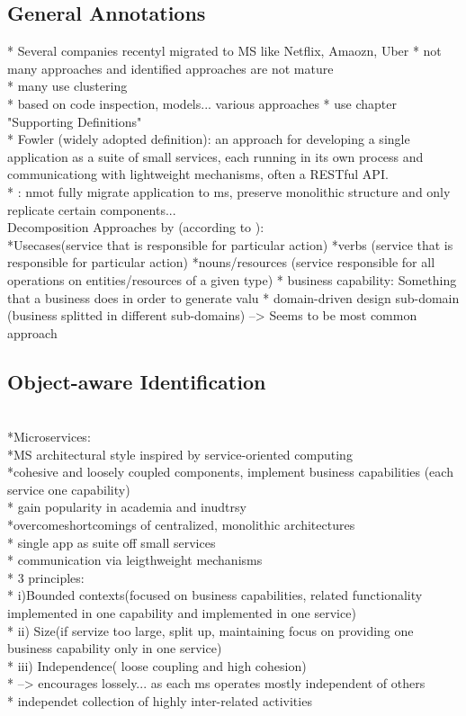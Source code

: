 \subsection{General Annotations}
* Several companies recentyl migrated to MS like Netflix, Amaozn, Uber
* not many approaches and identified approaches are not mature\\
* many use clustering \\
* based on code inspection, models... various approaches
* use chapter "Supporting Definitions"\\
* Fowler (widely adopted definition): an approach for developing a single application as a suite of small services, each running in its own process and communicationg with lightweight mechanisms, often a RESTful API. \\
* \cite{interfaceAnalysisBaresi}: nmot fully migrate application to ms, preserve monolithic structure and only replicate certain components... \\
Decomposition Approaches by (according to \cite{FunctionalDecompositionHeinrich}): \\
*Usecases(service that is responsible for particular action) 
*verbs (service that is responsible for particular action)
*nouns/resources (service responsible for all operations on entities/resources of a given type)
* business capability: Something that a business does in order to generate valu
* domain-driven design sub-domain (business splitted in different sub-domains) --> Seems to be most common approach


\subsection{Object-aware Identification}
\cite{ObjectAwareAmiri} \\
*Microservices:\\
*MS architectural style inspired by service-oriented computing \\
*cohesive and loosely coupled components, implement business capabilities (each service one capability)\\
* gain popularity in academia and inudtrsy\\
*overcomeshortcomings of centralized, monolithic architectures\\
* single app as suite off small services\\
* communication via leigthweight  mechanisms\\
* 3 principles: \\
* i)Bounded contexts(focused on business capabilities, related functionality implemented in one capability and implemented in one service)\\
* ii)  Size(if servize too large, split up, maintaining focus on providing one business capability only in one service)\\
* iii) Independence( loose coupling and high cohesion)\\
* --> encourages lossely... as each ms operates mostly independent of others \\ 
* independet collection of highly inter-related activities \\

